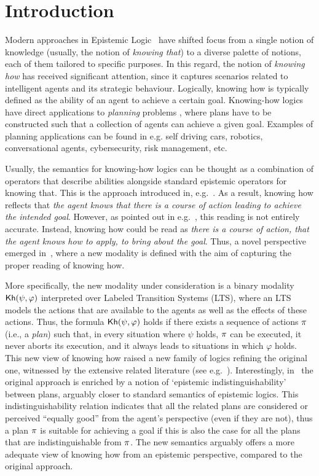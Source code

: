 \section{Introduction}
\label{sec:intro}

Modern approaches in Epistemic Logic~\cite{Hintikka:1962} have shifted focus from a single notion of knowledge (usually, the notion of \emph{knowing that}) to a diverse palette of notions, each of them tailored to specific purposes. In this regard, the notion of \emph{knowing how} has received significant attention, since it captures scenarios related to intelligent agents and its strategic behaviour. Logically, knowing how is typically defined as the ability of an agent to achieve a certain goal.  Knowing-how logics have direct applications to \emph{planning} problems \cite{Stuart21},  where  plans have to be constructed such that a collection of agents can achieve a given goal.  Examples of planning applications can be found in e.g. self driving cars,  robotics,  conversational agents,  cybersecurity,  risk management,  etc.

Usually,  the semantics for knowing-how logics can be thought as a combination of operators that describe abilities alongside standard epistemic operators for knowing that.  This is the approach introduced in, e.g.~\cite{Mccarthy69,Moore85,Les00,Hoek00,HerzigT06}. As a result,  knowing how reflects that \emph{the agent knows that there is a course of action leading to achieve the intended goal}. However,  as pointed out in e.g.~\cite{JamrogaA07,Herzig15}, this reading is not entirely accurate.  Instead, knowing how could be read as \emph{there is a course of action, that the agent knows how to apply, to bring about the goal}. Thus, a novel perspective emerged in~\cite{Wang15lori,Wang16,Wang2016}, where a new modality is defined with the aim of capturing the proper reading of knowing how. 

More specifically, the new modality under consideration is a binary modality ${\mathsf{Kh}}(\psi,\varphi)$ interpreted over Labeled Transition Systems (LTS), where an LTS models the  actions that are available to the agents as well as the effects of these actions. Thus,  the formula ${\mathsf{Kh}}(\psi,\varphi)$ holds if there exists a sequence of actions $\pi$ (i.e., a \emph{plan}) such that,  in every situation where $\psi$ holds, $\pi$ can be executed, it never aborts its execution, and it always leads to situations in which $\varphi$ holds. This new view of knowing how raised a new family of logics refining the original one, witnessed by the extensive related literature (see e.g.~\cite{LiWang17,Li17,FervariHLW17,NaumovT19,Naumov2018a}). Interestingly, in~\cite{AFSVQ21,AFSVQ25} the original approach is enriched by a notion of `epistemic indistinguishability' between plans, arguably closer to standard semantics of epistemic logics. This indistinguishability relation indicates that all the related plans are considered or perceived ``equally good''
from the agent's perspective (even if they are not), thus a plan $\pi$ is suitable for achieving a goal if this is also the case for all the plans that are indistinguishable from $\pi$. The new semantics arguably offers a more adequate view of knowing how from an epistemic perspective, compared to the original approach.

